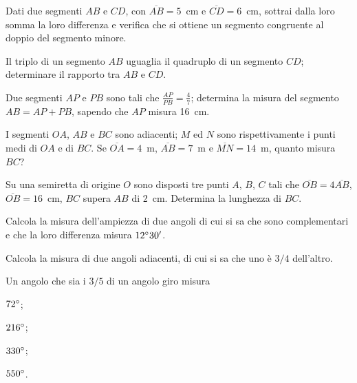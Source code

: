 \begin{multicols}{2}
\begin{esercizio}
\label{ese:1.105}
Dati due segmenti $AB$ e $CD$, con $\overline{AB} = 5$~cm e $\overline{CD} = 6$~cm, sottrai dalla loro somma la loro differenza e verifica che si ottiene un segmento congruente al doppio del segmento minore.
\end{esercizio}

\begin{esercizio}
\label{ese:1.106}
Il triplo di un segmento $AB$ uguaglia il quadruplo di un segmento $CD$; determinare il rapporto tra $AB$ e $CD$.
\end{esercizio}

\begin{esercizio}
\label{ese:1.107}
Due segmenti $AP$ e $PB$ sono tali che $\frac{AP}{PB}=\frac{4}{7}$; determina la misura del segmento $AB=AP+PB$, sapendo che $AP$ misura 16~cm.
\end{esercizio}

\begin{esercizio}
\label{ese:1.108}
I segmenti $OA$, $AB$ e $BC$ sono adiacenti; $M$ ed $N$ sono rispettivamente i punti medi di $OA$ e di $BC$. Se $\overline{OA}=4$~m, $\overline{AB}=7$~m e $\overline{MN}=14$~m, quanto misura $BC$?
\end{esercizio}

\begin{esercizio}
\label{ese:1.109}
Su una semiretta di origine $O$ sono disposti tre punti $A$, $B$, $C$ tali che $\overline{OB}=4\overline{AB}$, $\overline{OB}=16$~cm, $BC$ supera $AB$ di 2~cm. Determina la lunghezza di $BC$.
\end{esercizio}

\begin{esercizio}
\label{ese:1.110}
Calcola la misura dell'ampiezza di due angoli di cui si sa che sono complementari e che la loro differenza misura $12{}^{\circ}30'$.
\end{esercizio}
 
\begin{esercizio}
\label{ese:1.111}
Calcola la misura di due angoli adiacenti, di cui si sa che uno è $3/4$ dell'altro.
\end{esercizio}

\begin{esercizio}
\label{ese:1.112}
Un angolo che sia i $3/5$ di un angolo giro misura
\begin{multicols}{2}
\begin{enumeratea}
\item $72{}^{\circ}$;	\item $216{}^{\circ}$;	\item $330{}^{\circ}$;	\item $550{}^{\circ}$.
\end{enumeratea}
\end{multicols}
\end{esercizio}


\end{multicols}
